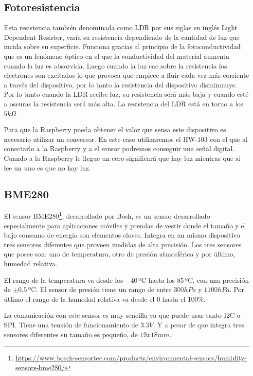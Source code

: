 \documentclass[a4paper, 12pt]{book}
\begin{document}
\subsection{Fotoresistencia}
\label{subsec:fotoresistencia}

Esta resistencia también denominada como LDR por sus siglas en inglés Light Dependent Resistor, varía su resistencia dependiendo de la cantidad de luz que incida sobre su superficie. Funciona gracias al principio de la fotoconductividad que es un fenómeno óptico en el que la conductividad del material aumenta cuando la luz es absorvida. Luego cuando la luz cae sobre la resistencia los electrones son excitados lo que provoca que empiece a fluir cada vez más corriente a través del dispositivo, por lo tanto la resistencia del dispositivo dismimnuye. Por lo tanto cuando la LDR recibe luz, su resistencia será más baja y cuando esté a oscuras la resistencia será más alta. La resistencia del LDR está en torno a los $5 k\Omega$

Para que la Raspberry pueda obtener el valor que sensa este dispositivo es necesario utilizar un conversor. En este caso utilizaremos el HW-103 con el que al conectarlo a la Raspberry y a el sensor podremos conseguir una señal digital. Cuando a la Raspberry le llegue un cero significará que hay luz mientras que si lee un uno es que no hay luz.

\subsection{BME280}
\label{subsec:bme280}

El sensor BME280\footnote{\url{https://www.bosch-sensortec.com/products/environmental-sensors/humidity-sensors-bme280/}}, desarrollado por Bosh, es un sensor desarrollado especialmente para aplicaciones móviles y prendas de vestir donde el tamaño y el bajo consumo de energía son elementos claves. Integra en un mismo dispositivo tres sensores diferentes que proveen medidas de alta precisión. Los tres sensores que posee son: uno de temperatura, otro de presión atmosférica y por último, humedad relativa. 

El rango de la temperatura va desde los $-40\, \mbox{ºC}$ hasta los $85\, \mbox{ºC}$, con una precisión de $\pm 0.5\, \mbox{ºC}$. El sensor de presión tiene un rango de entre $300 hPa$ y $1100 hPa$. Por útlimo el rango de la humedad relativa va desde el 0 hasta el 100\%.

La comunicación con este sensor es muy sencilla ya que puede usar tanto I2C o SPI. Tiene una tensión de funcionamiento de $3.3V$. Y a pesar de que integra tres sensores diferentes su tamaño es pequeño, de $19x18 mm$.
\end{document}
